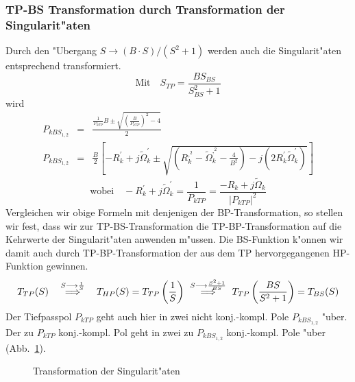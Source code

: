 \subsubsection{TP-BS Transformation durch Transformation der Singularit"aten}
Durch den "Ubergang $S \longrightarrow(B\cdot S)/(S^2+1)$
werden auch die Singularit"aten entsprechend transformiert.\\
\begin{equation*}
        \mbox{Mit}\quad S_{TP}=\frac{BS_{BS}}{S_{BS}^{2}+1}
\end{equation*}
\nit wird
\begin{eqnarray}
P_{kBS_{1,2}} &=& \frac{\frac{1}{P_{kTP}}B \pm \sqrt{\left(\frac{B}
{P_{kTP}}\right)^{2}-4}}{2} \nonumber \\
P_{kBS_{1,2}} &=& \frac{B}{2}\left[-R_{k}^{'}+j\tilde{\Omega}_{k}^{'} \pm
\sqrt{\left(R^{,^{2}}_{k}-\tilde{\Omega}_{k}^{,^{2}}-\frac{4}{B^{2}}\right)
-j(2R_{k}^{'}\tilde{\Omega}_{k}^{'})}\right]
\end{eqnarray}
\begin{equation}
\mbox{wobei} \quad 
-R_{k}^{'}+j\tilde{\Omega}_{k}^{'}=\frac{1}{P_{kTP}}=
\frac{-R_{k}+j\tilde{\Omega}_{k}}{|P_{kTP}|^{2}}
\end{equation}
Vergleichen wir obige Formeln mit denjenigen der BP-Transformation, so
stellen wir fest, dass wir zur TP-BS-\-Transformation die
TP-BP-\-Transformation auf die Kehrwerte der Singularit"aten anwenden
m"ussen.  Die BS-Funktion k"onnen wir damit auch durch
TP-BP-\-Transformation der aus dem TP hervorgegangenen HP-Funktion
gewinnen.
\begin{equation}
T_{TP}(S) 
\stackrel{S\longrightarrow \frac{1}{S}}
{\hspace{0.5cm}\Longrightarrow\hspace{0.5cm}}
T_{HP}(S)=T_{TP}\left(\frac{1}{S}\right) 
\stackrel{S\longrightarrow \frac{S^{2}+1}{BS}}
{\hspace{0.5cm}\Longrightarrow\hspace{0.5cm}}
T_{TP}\left(\frac{BS}{S^{2}+1}\right)=T_{BS}(S)
\end{equation}
Der Tiefpasspol $P_{kTP}$  geht auch hier in zwei nicht konj.-kompl. Pole
$P_{kBS_{1,2}}$ "uber. Der zu $P_{kTP}$ konj.-kompl. Pol geht in zwei zu
$P_{kBS_{1,2}}$ konj.-kompl. Pole "uber (Abb.~\ref{transs-tp-bs}).
\begin{figure}[!htb]
\begin{center}
  \caption{Transformation der Singularit"aten \label{transs-tp-bs}}
\end{center}
\vspace*{-6mm}
\end{figure}~\\
